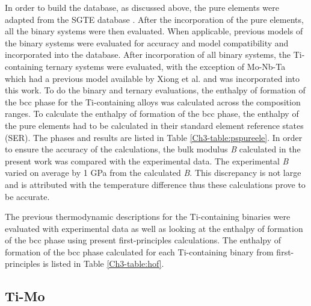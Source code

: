 In order to build the database, as discussed above, the pure elements were adapted from the SGTE database \cite{Dinsdale1991}. After the incorporation of the pure elements, all the binary systems were then evaluated. When applicable, previous models of the binary systems were evaluated for accuracy and model compatibility and incorporated into the database. After incorporation of all binary systems, the Ti-containing ternary systems were evaluated, with the exception of Mo-Nb-Ta which had a previous model available by Xiong et al. \cite{Xiong2004} and was incorporated into this work. To do the binary and ternary evaluations, the enthalpy of formation of the bcc phase for the Ti-containing alloys was calculated across the composition ranges. To calculate the enthalpy of formation of the bcc phase, the enthalpy of the pure elements had to be calculated in their standard element reference states (SER). The phases and results are listed in Table \ref{Ch3-table:pspureele}. In order to ensure the accuracy of the calculations, the bulk modulus \textit{B} calculated in the present work was compared with the experimental data. The experimental \textit{B} varied on average by 1 GPa from the calculated \textit{B}. This discrepancy is not large and is attributed with the temperature difference thus these calculations prove to be accurate. 

The previous thermodynamic descriptions for the Ti-containing binaries were evaluated with experimental data as well as looking at the enthalpy of formation of the bcc phase using present first-principles calculations. The enthalpy of formation of the bcc phase calculated for each Ti-containing binary from first-principles is listed in Table \ref{Ch3-table:hof}. 



\subsection{Ti-Mo}

